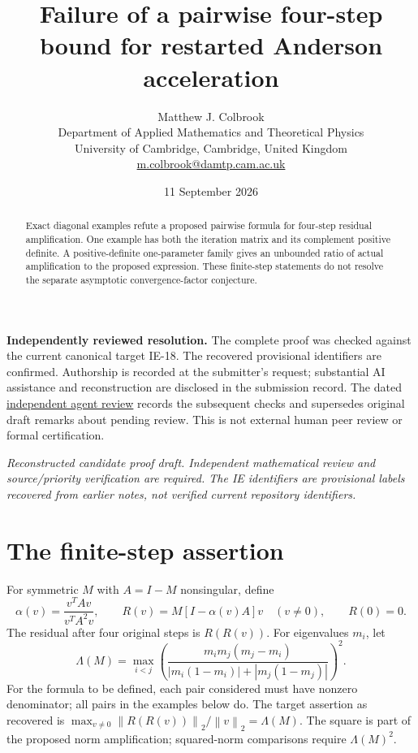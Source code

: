 \documentclass[11pt]{article}
\title{Failure of a pairwise four-step bound for restarted Anderson acceleration}
\author{Matthew J. Colbrook\\\small Department of Applied Mathematics and Theoretical Physics\\\small University of Cambridge, Cambridge, United Kingdom\\\small\href{mailto:m.colbrook@damtp.cam.ac.uk}{m.colbrook@damtp.cam.ac.uk}}
\date{11 September 2026}
\newcommand{\norm}[1]{\left\lVert#1\right\rVert}
\begin{document}
\maketitle

\noindent\textbf{Independently reviewed resolution.} The complete proof was checked against the current canonical target IE-18. The recovered provisional identifiers are confirmed. Authorship is recorded at the submitter's request; substantial AI assistance and reconstruction are disclosed in the submission record.
The dated \href{https://github.com/MColbrook/OpenProblemsInNLA/blob/codex/colbrook-recovered-submissions/references/colbrook-recovered-2026-09-11/verification/reviews/IE-18-review.md}{independent agent review} records the subsequent checks and supersedes original draft remarks about pending review. This is not external human peer review or formal certification.
\par\medskip

\noindent\textit{Reconstructed candidate proof draft. Independent mathematical review and source/priority verification are required. The IE identifiers are provisional labels recovered from earlier notes, not verified current repository identifiers.}


\begin{abstract}
Exact diagonal examples refute a proposed pairwise formula for four-step residual amplification. One example has both the iteration matrix and its complement positive definite. A positive-definite one-parameter family gives an unbounded ratio of actual amplification to the proposed expression. These finite-step statements do not resolve the separate asymptotic convergence-factor conjecture.
\end{abstract}
\section{The finite-step assertion}
For symmetric $M$ with $A=I-M$ nonsingular, define
\[
\alpha(v)=\frac{v^TAv}{v^TA^2v},\qquad R(v)=M[I-\alpha(v)A]v\quad(v\ne0),\qquad R(0)=0.
\]
The residual after four original steps is $R(R(v))$. For eigenvalues $m_i$, let
\[
\Lambda(M)=\max_{i<j}\left(\frac{m_im_j(m_j-m_i)}{|m_i(1-m_i)|+|m_j(1-m_j)|}\right)^2.
\]
For the formula to be defined, each pair considered must have nonzero denominator; all pairs in the examples below do. The target assertion as recovered is $\max_{v\ne0}\norm{R(R(v))}_2/\norm v_2=\Lambda(M)$. The square is part of the proposed norm amplification; squared-norm comparisons require $\Lambda(M)^2$.
\end{document}
